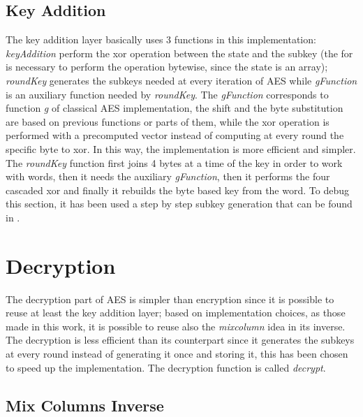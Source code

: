 \documentclass{article}
\begin{document}
\subsection{Key Addition}

The key addition layer basically uses 3 functions in this implementation: \textit{keyAddition} perform the xor operation between the state and the subkey (the for is necessary to perform the operation bytewise, since the state is an array); \textit{roundKey} generates the subkeys needed at every iteration of AES while \textit{gFunction} is an auxiliary function needed by \textit{roundKey}. \newline
The \textit{gFunction} corresponds to function \textit{g} of classical AES implementation, the shift and the byte substitution are based on previous functions or parts of them, while the xor operation is performed with a precomputed vector instead of computing at every round the specific byte to xor. In this way, the implementation is more efficient and simpler.\newline
The \textit{roundKey} function first joins 4 bytes at a time of the key in order to work with words, then it needs the auxiliary \textit{gFunction}, then it performs the four cascaded xor and finally it rebuilds the byte based key from the word.\newline
To debug this section, it has been used a step by step subkey generation that can be found in \cite{AESsteps}.   


\section{Decryption}

The decryption part of AES is simpler than encryption since it is possible to reuse at least the key addition layer; based on implementation choices, as those made in this work, it is possible to reuse also the \textit{mixcolumn} idea in its inverse. The decryption is less efficient than its counterpart since it generates the subkeys at every round instead of generating it once and storing it, this has been chosen to speed up the implementation. The decryption function is called \textit{decrypt}.
 
\subsection{Mix Columns Inverse}
\end{document}

